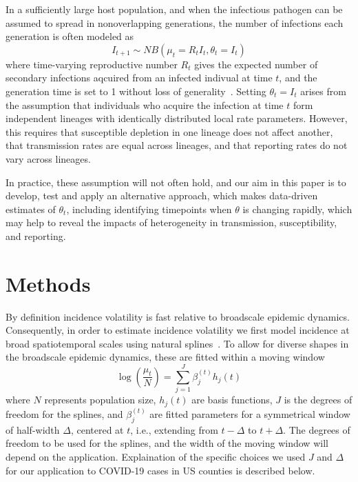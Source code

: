 \documentclass[11pt,letterpaper]{article}
\begin{document}
In a sufficiently large host population, and when the infectious pathogen can be assumed to spread in nonoverlapping generations, the number of infections each generation is often modeled as
\begin{equation}
    I_{t+1} \sim NB(\mu_t = R_t I_t, \theta_t = I_t)
\end{equation}
where time-varying reproductive number $R_t$ gives the expected number of secondary infections aqcuired from an infected indivual at time $t$, and the generation time is set to 1 without loss of generality~\citep{kendall1949stochastic, bjornstad2002dynamics}. 
Setting $\theta_t = I_t$ arises from the assumption that individuals who acquire the infection at time $t$ form independent lineages with identically distributed local rate parameters.
However, this requires that susceptible depletion in one lineage does not affect another, that transmission rates are equal across lineages, and that reporting rates do not vary across lineages. 

In practice, these assumption will not often hold, and our aim in this paper is to develop, test and apply an alternative approach, which makes data-driven estimates of $\theta_t$, including identifying timepoints when $\theta$ is changing rapidly, which may help to reveal the impacts of heterogeneity in transmission, susceptibility, and reporting. 

\section*{Methods}
By definition incidence volatility is fast relative to broadscale epidemic dynamics. 
Consequently, in order to estimate incidence volatility we first model incidence at broad spatiotemporal scales using natural splines~\citep{perperoglou2019review}. To allow for diverse shapes in the broadscale epidemic dynamics, these are fitted within a moving window
\begin{equation}
  \log\left(\dfrac{\mu_t}{N}\right)  = \sum_{j=1}^J \beta_j^{(t)} h_j(t)
\end{equation}
where $N$ represents population size, $h_j(t)$ are basis functions, $J$ is the degrees of freedom for the splines, and $\beta_j^{(t)}$ are fitted parameters for a symmetrical window of half-width $\Delta$, centered at $t$, i.e., extending from $t-\Delta$ to $t + \Delta$. 
The degrees of freedom to be used for the splines, and the width of the moving window will depend on the application.
Explaination of the specific choices we used $J$ and $\Delta$ for our application to COVID-19 cases in US counties is described below.
\end{document}

